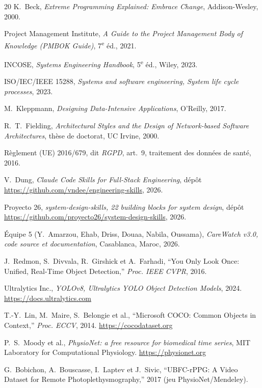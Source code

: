 \documentclass[11pt,a4paper]{article}
\begin{document}
\begin{thebibliography}{20}
 K.~Beck, \textit{Extreme Programming Explained: Embrace Change}, Addison-Wesley, 2000.

 Project Management Institute, \textit{A Guide to the Project Management Body of
Knowledge (PMBOK Guide)}, 7\textsuperscript{e} éd., 2021.

 INCOSE, \textit{Systems Engineering Handbook}, 5\textsuperscript{e} éd., Wiley, 2023.

 ISO/IEC/IEEE 15288, \textit{Systems and software engineering, System life cycle
processes}, 2023.

 M.~Kleppmann, \textit{Designing Data-Intensive Applications}, O'Reilly, 2017.

 R.~T.~Fielding, \textit{Architectural Styles and the Design of Network-based
Software Architectures}, thèse de doctorat, UC Irvine, 2000.

 Règlement (UE) 2016/679, dit \textit{RGPD}, art.~9, traitement des données de
santé, 2016.

 V.~Dung, \textit{Claude Code Skills for Full-Stack Engineering}, dépôt
\url{https://github.com/vndee/engineering-skills}, 2026.

 Proyecto 26, \textit{system-design-skills, 22 building blocks for system
design}, dépôt \url{https://github.com/proyecto26/system-design-skills}, 2026.

 Équipe 5 (Y.~Amarzou, Ehab, Driss, Douaa, Nabila, Oussama), \textit{CareWatch v3.0, code source et documentation}, Casablanca,
Maroc, 2026.

 J.~Redmon, S.~Divvala, R.~Girshick et A.~Farhadi, ``You Only Look Once:
Unified, Real-Time Object Detection,'' \textit{Proc. IEEE CVPR}, 2016.

 Ultralytics Inc., \textit{YOLOv8, Ultralytics YOLO Object Detection
Models}, 2024. \url{https://docs.ultralytics.com}

 T.-Y.~Lin, M.~Maire, S.~Belongie et al., ``Microsoft COCO: Common Objects in
Context,'' \textit{Proc. ECCV}, 2014. \url{https://cocodataset.org}

 P.~S.~Moody et al., \textit{PhysioNet: a free resource for biomedical time
series}, MIT Laboratory for Computational Physiology. \url{https://physionet.org}

 G.~Bobichon, A.~Bouscasse, I.~Laptev et J.~Sivic, ``UBFC-rPPG: A Video Dataset for
Remote Photoplethysmography,'' 2017 (jeu PhysioNet/Mendeley).


\end{thebibliography}
\end{document}
